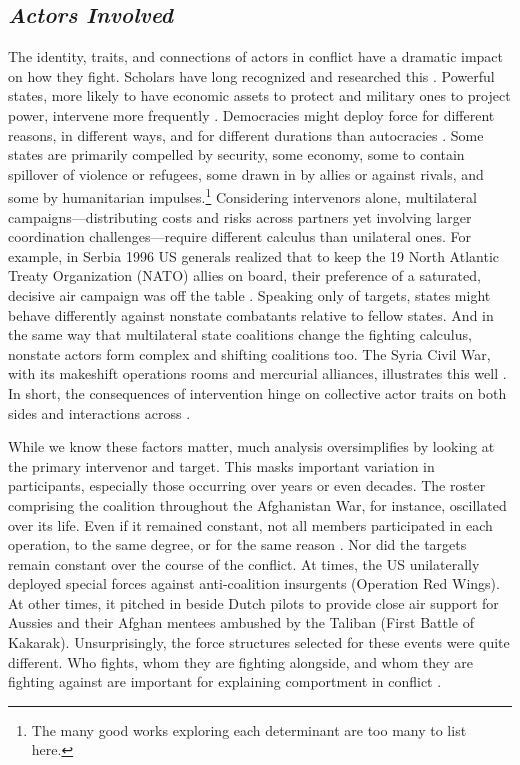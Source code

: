 \documentclass[fleqn,12pt]{article}
\begin{document}
\subsection*{\textit{Actors Involved}}
The identity, traits, and connections of actors in conflict have a dramatic impact on how they fight. Scholars have long recognized and researched this \citep{huth_majorpowerintervention_1998}. Powerful states, more likely to have economic assets to protect and military ones to project power, intervene more frequently \citep{sullivan_militaryinterventionpowerful_2009}. Democracies might deploy force for different reasons, in different ways, and for different durations than autocracies \citep{caverley_democraticmilitarismvoting_2014, talmadge_differentthreatsdifferent_2016}. Some states are primarily compelled by security, some economy, some to contain spillover of violence or refugees, some drawn in by allies or against rivals, and some by humanitarian impulses.\footnote{The many good works exploring each determinant are too many to list here.} Considering intervenors alone, multilateral campaigns—distributing costs and risks across partners yet involving larger coordination challenges—require different calculus than unilateral ones. For example, in Serbia 1996 US generals realized that to keep the 19 North Atlantic Treaty Organization (NATO) allies on board, their preference of a saturated, decisive air campaign was off the table \citep{cooper_politicsairstrikes_2001}. Speaking only of targets, states might behave differently against nonstate combatants relative to fellow states. And in the same way that multilateral state coalitions change the fighting calculus, nonstate actors form complex and shifting coalitions too. The Syria Civil War, with its makeshift operations rooms and mercurial alliances, illustrates this well \citep{cranmer_coalitionqualitymultinational_2018}. In short, the consequences of intervention hinge on collective actor traits on both sides and interactions across \citep{carment_threecompanyevaluating_1998, caverley_mythmilitarymyopia_2009}.

While we know these factors matter, much analysis oversimplifies by looking at the primary intervenor and target. This masks important variation in participants, especially those occurring over years or even decades. The roster comprising the coalition throughout the Afghanistan War, for instance, oscillated over its life. Even if it remained constant, not all members participated in each operation, to the same degree, or for the same reason \citep{gannon_keepingyourfriends_2021}. Nor did the targets remain constant over the course of the conflict. At times, the US unilaterally deployed special forces against anti-coalition insurgents (Operation Red Wings). At other times, it pitched in beside Dutch pilots to provide close air support for Aussies and their Afghan mentees ambushed by the Taliban (First Battle of Kakarak). Unsurprisingly, the force structures selected for these events were quite different. Who fights, whom they are fighting alongside, and whom they are fighting against are important for explaining comportment in conflict \citep{cappellazielinski_understandingbattlefieldcoalitions_2022}.
\end{document}
